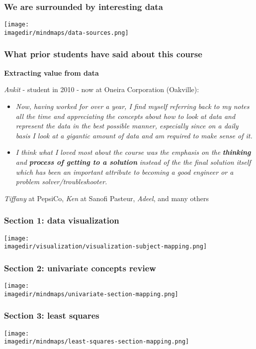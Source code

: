 \begin{frame}\frametitle{We are surrounded by interesting data}
	\begin{center}
		\texttt{[image: \\imagedir/mindmaps/data-sources.png]}
	\end{center}
\end{frame}

\begin{frame}\frametitle{What prior students have said about this course}

	\textbf{Extracting value from data}

	\emph{Ankit} - student in 2010 - now at Oneira Corporation (Oakville):
	\begin{itemize}
		\item	\emph{Now, having worked for over a year, I find myself referring back to my notes all the time and appreciating the concepts about how to look at data and represent the data in the best possible manner, especially since on a daily basis I look at a gigantic amount of data and am required to make sense of it.}
	\end{itemize}
	\begin{itemize}
		\item	\emph{I think what I loved most about the course was the emphasis on the} \textbf{\emph{thinking}} \emph{and} \textbf{\emph{process of getting to a solution}} \emph{instead of the the final solution itself which has been an important attribute to becoming a good engineer or a problem solver/troubleshooter.}
	\end{itemize}

	\vspace{12pt}
	\emph{Tiffany} at PepsiCo, \emph{Ken} at Sanofi Pasteur, \emph{Adeel}, and many others
\end{frame}

\begin{frame}\frametitle{Section 1: data visualization}
	\texttt{[image: \\imagedir/visualization/visualization-subject-mapping.png]}
\end{frame}

\begin{frame}\frametitle{Section 2: univariate concepts review}

	\texttt{[image: \\imagedir/mindmaps/univariate-section-mapping.png]}
\end{frame}

\begin{frame}\frametitle{Section 3: least squares}

	\texttt{[image: \\imagedir/mindmaps/least-squares-section-mapping.png]}
\end{frame}

